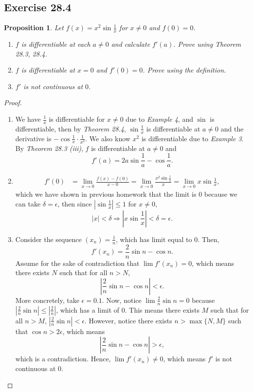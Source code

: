 \documentclass{article}
\newtheorem{proposition}[thm]{Proposition}
\renewcommand*{\implies}{\ensuremath{\Longrightarrow}}
\begin{document}
\subsection*{Exercise 28.4}
\begin{proposition}
    Let $f(x)=x^2\sin \frac{1}{x}$ for $x\neq 0$ and $f(0)=0$.
    \begin{enumerate}[label=\textbf{(\alph*)}]
        \item $f$ is differentiable at each $a\neq 0$ and calculate $f'(a)$. Prove using 
        \emph{Theorem 28.3, 28.4}.
        \item $f$ is differentiable at $x=0$ and $f'(0)=0$. Prove using the definition.
        \item $f'$ is not continuous at $0$.
    \end{enumerate}
\end{proposition}
\begin{proof}
    \begin{enumerate}[label=\textbf{(\alph*)}]
        \item 
        We have $\frac{1}{x}$ is differentiable for $x\neq 0$ due to \emph{Example 4}, and $\sin$ is differentiable, 
        then by \emph{Theorem 28.4}, $\sin\frac{1}{x}$ is differentiable at $a\neq 0$ and the derivative 
        is $-\cos \frac{1}{x}\cdot \frac{1}{x^2}$. We also know $x^2$ is differentiable due to 
        \emph{Example 3}. By \emph{Theorem 28.3 (iii)}, $f$ is differentiable at $a\neq 0$ and
        $$f'(a)=2a\sin \frac{1}{a}-\cos \frac{1}{a}.$$

        \item \begin{align*}
            f'(0) & = \lim_{x\to0} \frac{f(x)-f(0)}{x-0} = 
            \lim_{x\to0} \frac{x^2\sin \frac{1}{x}}{x} = 
            \lim_{x\to0} x\sin \frac{1}{x},
        \end{align*}
        which we have shown in previous homework that the limit is 0 because 
        we can take $\delta = \epsilon$, then since $|\sin\frac{1}{x}|\le 1$ for $x\neq 0$,
        $$|x|<\delta\implies \left|x\sin\frac{1}{x}\right|<\delta=\epsilon.$$

        \item Consider the sequence $(x_n)=\frac{1}{n}$, which has limit equal to 0. Then, 
        $$f'(x_n) = \frac{2}{n}\sin n - \cos n.$$ Assume for the sake of contradiction that
        $\lim f'(x_n)=0$, which means there exists $N$ such that for all $n> N$,
        $$\left|\frac{2}{n}\sin n - \cos n\right|<\epsilon.$$ More concretely, take $\epsilon = 0.1$.
        Now, notice $\lim \frac{2}{n}\sin n=0$
        because $\left|\frac{2}{n}\sin n\right|\le \left|\frac{2}{n}\right|$, which has a limit of 0. 
        This means there exists $M$ such that for all $n> M$, $\left|\frac{2}{n}\sin n\right|<\epsilon$.
        However, notice there exists $n> \max\{N,M\}$ such that $\cos n > 2\epsilon$, which means 
        $$\left|\frac{2}{n}\sin n - \cos n\right|>\epsilon,$$
        which is a contradiction. Hence, $\lim f'(x_n)\neq 0$, which means $f'$ is not continuous 
        at 0.

    \end{enumerate}
\end{proof}
\end{document}
